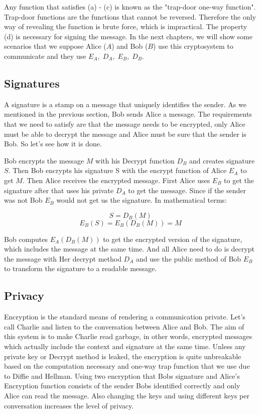 \documentclass[12pt, letterpaper]{article}
\begin{document}
Any function that satisfies (a) - (c) is known as the "trap-door one-way function". Trap-door functions are the functions that cannot be reversed. Therefore the only way of revealing the function is brute force, which is impractical. The property (d) is necessary for signing the message. In the next chapters, we will show some scenarios that we suppose Alice ($A$) and Bob ($B$) use this cryptosystem to communicate and they use $E_A, \; D_A, \; E_B, \; D_B$.

\subsection{Signatures}

A signature is a stamp on a message that uniquely identifies the sender. As we mentioned in the previous section, Bob sends Alice a message. The requirements that we need to satisfy are that the message needs to be encrypted, only Alice must be able to decrypt the message and Alice must be sure that the sender is Bob. So let's see how it is done.

Bob encrypts the message $M$ with his Decrypt function $D_B$ and creates signature $S$. Then Bob encrypts his signature S with the encrypt function of Alice $E_A$ to get $M$. Then Alice receives the encrypted message. First Alice uses $E_B$ to get the signature after that uses his private $D_A$ to get the message. Since if the sender was not Bob $E_B$ would not get us the signature. In mathematical terms:

\[ S = D_B(M) \] 
\[ E_B(S) = E_B(D_B(M)) = M \] 

Bob computes $E_A(D_B(M))$ to get the encrypted version of the signature, which includes the message at the same time. And all Alice need to do is decrypt the message with Her decrypt method $D_A$ and use the public method of Bob $E_B$ to transform the signature to a readable message.

\subsection{Privacy}

Encryption is the standard means of rendering a communication private. Let's call Charlie and listen to the conversation between Alice and Bob. The aim of this system is to make Charlie read garbage, in other words, encrypted messages which actually include the context and signature at the same time. Unless any private key or Decrypt method is leaked, the encryption is quite unbreakable based on the computation necessary and one-way trap function that we use due to Diffie and Hellman. Using two encryption that Bobs signature and Alice's Encryption function consists of the sender Bobs identified correctly and only Alice can read the message. Also changing the keys and using different keys per conversation increases the level of privacy.
\end{document}
